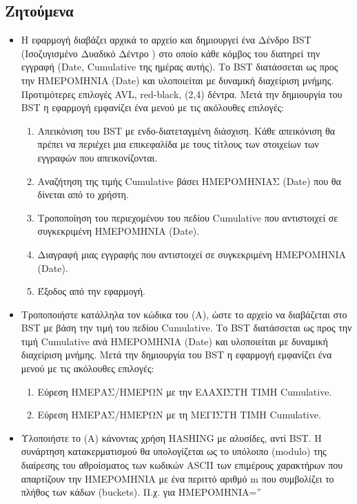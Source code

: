 \documentclass[a4paper,12pt]{article}
\begin{document}
	\subsection{Ζητούμενα}
	\begin{itemize}
		\item[(Α)] Η εφαρμογή διαβάζει αρχικά το αρχείο και δημιουργεί ένα Δένδρο BST (Ισοζυγισμένο Δυαδικό
		Δέντρο ) στο οποίο κάθε κόμβος του διατηρεί την εγγραφή (Date, Cumulative της ημέρας αυτής).
		Το BST διατάσσεται ως προς την ΗΜΕΡΟΜΗΝΙΑ (Date) και υλοποιείται με δυναμική διαχείριση
		μνήμης. Προτιμότερες επιλογές AVL, red-black, (2,4) δέντρα. Μετά την δημιουργία του BST η
		εφαρμογή εμφανίζει ένα μενού με τις ακόλουθες επιλογές:
		\begin{enumerate}
			\item Απεικόνιση του BST με ενδο-διατεταγμένη διάσχιση. Κάθε απεικόνιση θα πρέπει να περιέχει
			μια επικεφαλίδα με τους τίτλους των στοιχείων των εγγραφών που απεικονίζονται.
			\item Αναζήτηση της τιμής Cumulative βάσει ΗΜΕΡΟΜΗΝΙΑΣ (Date) που θα δίνεται από το
			χρήστη.
			\item Τροποποίηση του περιεχομένου του πεδίου Cumulative που αντιστοιχεί σε συγκεκριμένη
			ΗΜΕΡΟΜΗΝΙΑ (Date).
			\item Διαγραφή μιας εγγραφής που αντιστοιχεί σε συγκεκριμένη ΗΜΕΡΟΜΗΝΙΑ (Date).
			\item Έξοδος από την εφαρμογή.
		\end{enumerate}
		\item[(Β)] Τροποποιήστε κατάλληλα τον κώδικα του (Α), ώστε το αρχείο να διαβάζεται στο BST με βάση
		την τιμή του πεδίου Cumulative. Το BST διατάσσεται ως προς την τιμή Cumulative ανά
		ΗΜΕΡΟΜΗΝΙΑ (Date) και υλοποιείται με δυναμική διαχείριση μνήμης. Μετά την δημιουργία του
		BST η εφαρμογή εμφανίζει ένα μενού με τις ακόλουθες επιλογές:
		\begin{enumerate}
			\item Εύρεση ΗΜΕΡΑΣ/ΗΜΕΡΩΝ με την ΕΛΑΧΙΣΤΗ ΤΙΜΗ Cumulative.
			\item Εύρεση ΗΜΕΡΑΣ/ΗΜΕΡΩΝ με τη ΜΕΓΙΣΤΗ ΤΙΜΗ Cumulative.
		\end{enumerate}
		\item[(Γ)] Υλοποιήστε το (Α) κάνοντας χρήση HASHING με αλυσίδες, αντί BST. Η συνάρτηση
		κατακερματισμού θα υπολογίζεται ως το υπόλοιπο (modulo) της διαίρεσης του αθροίσματος των
		κωδικών ASCII των επιμέρους χαρακτήρων που απαρτίζουν την ΗΜΕΡΟΜΗΝΙΑ με ένα περιττό
		αριθμό m που συμβολίζει το πλήθος των κάδων (buckets). Π.χ. για ΗΜΕΡΟΜΗΝΙΑ=”

\end{itemize}
\end{document}

